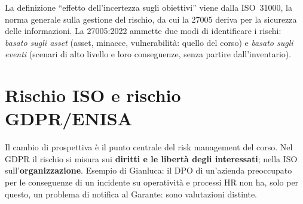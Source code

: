 \begin{integrazione}
La definizione ``effetto dell'incertezza sugli obiettivi'' viene dalla ISO~31000, la norma generale sulla
gestione del rischio, da cui la 27005 deriva per la sicurezza delle informazioni. La 27005:2022 ammette due
modi di identificare i rischi: \emph{basato sugli asset} (asset, minacce, vulnerabilità: quello del corso) e
\emph{basato sugli eventi} (scenari di alto livello e loro conseguenze, senza partire dall'inventario).
\end{integrazione}

\section{Rischio ISO e rischio GDPR/ENISA}
\label{sec:iso-enisa}
Il cambio di prospettiva è il punto centrale del risk management del corso. Nel GDPR il rischio si misura
sui \textbf{diritti e le libertà degli interessati}; nella ISO sull'\textbf{organizzazione}. Esempio di
Gianluca: il DPO di un'azienda preoccupato per le conseguenze di un incidente su operatività e processi HR
non ha, solo per questo, un problema di notifica al Garante: sono valutazioni distinte.

